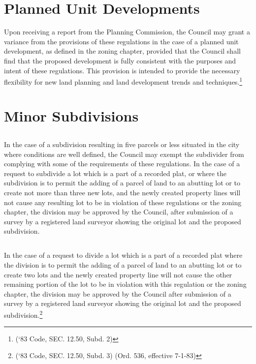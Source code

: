 \section{Planned Unit Developments}
Upon receiving a report from the Planning Commission, the Council may grant a variance from the provisions of these regulations in the case of a planned unit development, as defined in the zoning chapter, provided that the Council shall find that the proposed development is fully consistent with the purposes and intent of these regulations. This provision is intended to provide the necessary flexibility for new land planning and land development trends and techniques.\footnote{(‘83 Code, SEC. 12.50, Subd. 2)}
\section{Minor Subdivisions}
\subsection{}
In the case of a subdivision resulting in five parcels or less situated in the city where conditions are well defined, the Council may exempt the subdivider from complying with some of the requirements of these regulations. In the case of a request to subdivide a lot which is a part of a recorded plat, or where the subdivision is to permit the adding of a parcel of land to an abutting lot or to create not more than three new lots, and the newly created property lines will not cause any resulting lot to be in violation of these regulations or the zoning chapter, the division may be approved by the Council, after submission of a survey by a registered land surveyor showing the original lot and the proposed subdivision.
\subsection{}
In the case of a request to divide a lot which is a part of a recorded plat where the division is to permit the adding of a parcel of land to an abutting lot or to create two lots and the newly created property line will not cause the other remaining portion of the lot to be in violation with this regulation or the zoning chapter, the division may be approved by the Council after submission of a survey by a registered land surveyor showing the original lot and the proposed subdivision.\footnote{(‘83 Code, SEC. 12.50, Subd. 3)  (Ord. 536, effective 7-1-83)}

\setcounter{section}{98}
